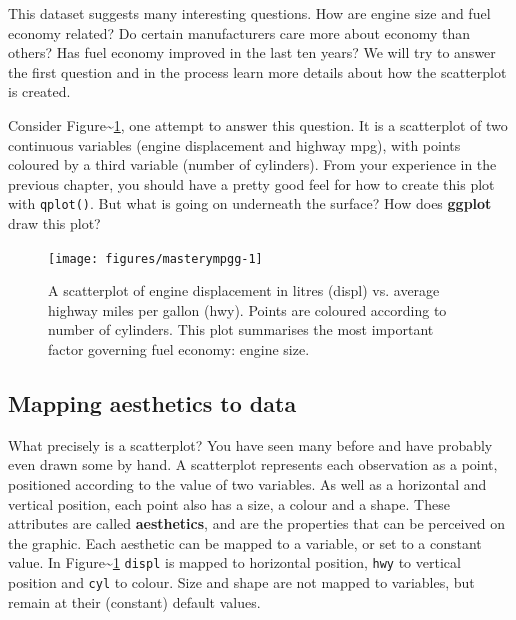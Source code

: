 This dataset suggests many interesting questions. How are engine size
and fuel economy related? Do certain manufacturers care more about
economy than others? Has fuel economy improved in the last ten years? We
will try to answer the first question and in the process learn more
details about how the scatterplot is created.


Consider Figure\textasciitilde{}\ref{fig:mpgg}, one attempt to answer
this question. It is a scatterplot of two continuous variables (engine
displacement and highway mpg), with points coloured by a third variable
(number of cylinders). From your experience in the previous chapter, you
should have a pretty good feel for how to create this plot with
\texttt{qplot()}. But what is going on underneath the surface? How does
\textbf{ggplot} draw this plot? 

\begin{Shaded}
\begin{Highlighting}[]
  
\end{Highlighting}
\end{Shaded}

\begin{figure}
\texttt{[image: figures/masterympgg-1]} \caption{A scatterplot of engine displacement in litres (displ) vs. average highway miles per gallon (hwy).  Points are coloured according to number of cylinders.  This plot summarises the most important factor governing fuel economy: engine size.\label{fig:mpgg}}
\end{figure}

\subsection{Mapping aesthetics to data}

What precisely is a scatterplot? You have seen many before and have
probably even drawn some by hand. A scatterplot represents each
observation as a point, positioned according to the value of two
variables. As well as a horizontal and vertical position, each point
also has a size, a colour and a shape. These attributes are called
\textbf{aesthetics}, and are the properties that can be perceived on the
graphic. Each aesthetic can be mapped to a variable, or set to a
constant value. In Figure\textasciitilde{}\ref{fig:mpgg} \texttt{displ}
is mapped to horizontal position, \texttt{hwy} to vertical position and
\texttt{cyl} to colour. Size and shape are not mapped to variables, but
remain at their (constant) default values. 

